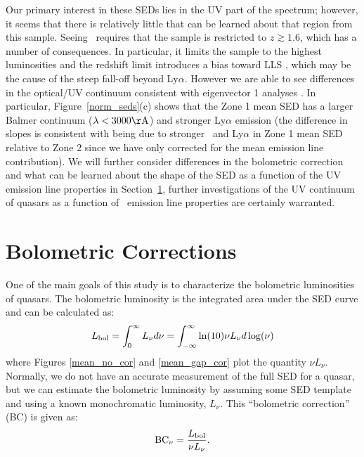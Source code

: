 Our primary interest in these SEDs lies in the UV part of the spectrum; however, it seems that there is relatively little that can be learned about that region from this sample.  Seeing \civ\ requires that the sample is restricted to $z\gtrsim1.6$, which has a number of consequences.  In particular, it limits the sample to the highest luminosities and the redshift limit introduces a bias toward LLS \citep{Worseck:2011}, which may be the cause of the steep fall-off beyond Ly$\alpha$.  
However we are able to see differences in the optical/UV continuum consistent with eigenvector 1 analyses \citep{Brotherton:1999}.  
In particular, Figure~\ref{norm_seds}(c) shows that the Zone 1 mean SED has 
a larger Balmer continuum ($\lambda<3000{\rm \AA}$) and stronger Ly$\alpha$ emission (the difference in slopes is consistent with being due to stronger \civ\ and Ly$\alpha$ in Zone 1 mean SED relative to Zone 2 since we have only corrected for the mean emission line contribution).
We will further consider differences in the bolometric correction and what can be learned about the shape of the SED as a function of the UV emission line properties in Section~\ref{bol}, 
further investigations of the UV continuum of quasars as a function of \civ\ emission line properties are certainly warranted.


\section{Bolometric Corrections} \label{bol}

One of the main goals of this study is to characterize the bolometric luminosities of quasars.  The bolometric luminosity is the integrated area under the SED curve and can be calculated as:
\begin{equation}
 L_{{\rm bol}} = \int_{0}^{\infty} L_{\nu} d\nu = \int_{-\infty}^{\infty} \ln(10) \nu L_{\nu} d\log(\nu)
\end{equation}
where Figures \ref{mean_no_cor} and \ref{mean_gap_cor} plot the quantity $\nu L_{\nu}$.
Normally, we do not have an accurate measurement of the full SED for a quasar, but we can estimate the bolometric luminosity by assuming some SED template and using a known monochromatic luminosity, $L_{\nu}$.  This ``bolometric correction'' (BC) is given as:
\begin{equation}
 {\rm BC}_{\nu} = \frac{L_{{\rm bol}}}{\nu L_{\nu}}.
\end{equation}

